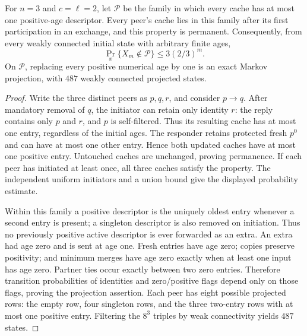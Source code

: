 \begin{proposition}
\label{prop:c2threepositivity}
For $n=3$ and $c=\ell=2$, let $\mathcal P$ be the family in
which every cache has at most one positive-age descriptor.
Every peer's cache lies in this family after its first
participation in an exchange, and this property is permanent.
Consequently, from every weakly connected initial state with
arbitrary finite ages,
\[
 \Pr_x\{X_m\notin\mathcal P\}\le3(2/3)^m.
\]
On $\mathcal P$, replacing every positive numerical age by one
is an exact Markov projection, with $487$ weakly connected
projected states.
\end{proposition}
\begin{proof}
Write the three distinct peers as $p,q,r$, and consider
$p\to q$. After mandatory removal of $q$, the initiator can
retain only identity $r$: the reply contains only $p$ and $r$,
and $p$ is self-filtered. Thus its resulting cache has at most
one entry, regardless of the initial ages. The responder
retains protected fresh $p^0$ and can have at most one other
entry. Hence both updated caches have at most one positive
entry. Untouched caches are unchanged, proving permanence.
If each peer has initiated at least once, all three caches
satisfy the property. The independent uniform initiators and
a union bound give the displayed probability estimate.

Within this family a positive descriptor is the uniquely
oldest entry whenever a second entry is present; a singleton
descriptor is also removed on initiation. Thus no previously
positive active descriptor is ever forwarded as an extra.
An extra had age zero and is sent at age one. Fresh entries
have age zero; copies preserve positivity; and minimum merges
have age zero exactly when at least one input has age zero.
Partner ties occur exactly between two zero entries.
Therefore transition probabilities of identities and
zero/positive flags depend only on those flags, proving the
projection assertion. Each peer has eight possible projected
rows: the empty row, four singleton rows, and the three
two-entry rows with at most one positive entry. Filtering
the $8^3$ triples by weak connectivity yields $487$ states.
\end{proof}

